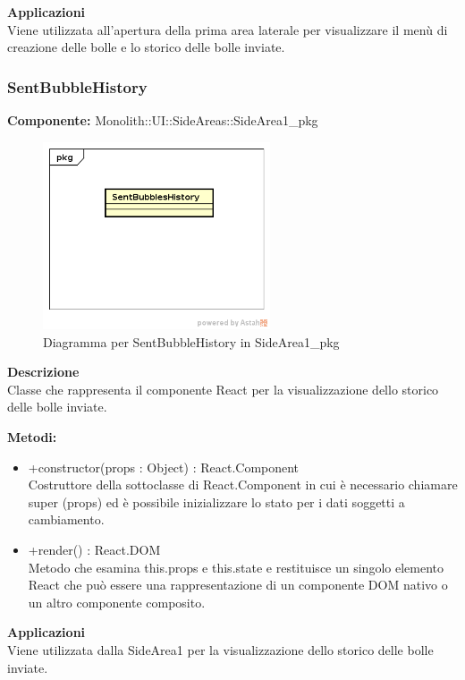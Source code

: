 \textbf{Applicazioni}\\
Viene utilizzata all'apertura della prima area laterale per visualizzare il menù di creazione delle bolle e lo storico delle bolle inviate. 


\clearpage

\subsubsection{SentBubbleHistory}
\textbf{Componente:}  Monolith::UI::SideAreas::SideArea1\_pkg\\
   \FloatBarrier
   \begin{figure}[ht]
   \centering
   \includegraphics[width=0.6\textwidth]{img/single-SentBubbleHistory}
   \caption{{Diagramma per SentBubbleHistory in SideArea1\_pkg}}
\end{figure}
\FloatBarrier
\textbf{Descrizione}\\
Classe che rappresenta il componente React per la visualizzazione dello storico delle bolle inviate.

\textbf{Metodi:} \begin{itemize}\item +constructor(props : Object) : React.Component \\Costruttore della sottoclasse di React.Component in cui è necessario chiamare super (props) ed è possibile inizializzare lo stato per i dati soggetti a cambiamento.\item +render() : React.DOM \\Metodo che esamina this.props e this.state e restituisce un singolo elemento React che può essere una rappresentazione di un componente DOM nativo o un altro componente composito.\end{itemize} 


\textbf{Applicazioni}\\
Viene utilizzata dalla SideArea1 per la visualizzazione dello storico delle bolle inviate. 


